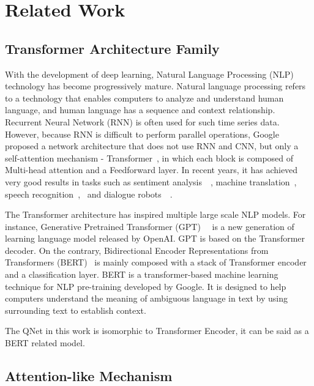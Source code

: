\section{Related Work}

\subsection{Transformer Architecture Family}

With the development of deep learning, Natural Language Processing (NLP) technology has become progressively mature.
Natural language processing refers to a technology that enables computers to analyze and understand human language, and human language has a sequence and context relationship. Recurrent Neural Network (RNN) is often used for such time series data. However, because RNN is difficult to perform parallel operations, Google proposed a network architecture that does not use RNN and CNN, but only a self-attention mechanism - Transformer~\cite{NIPS2017_3f5ee243}, in which each block is composed of Multi-head attention and a Feedforward layer. In recent years, it has achieved very good results in tasks such as sentiment analysis~\cite{naseem2020transformer}~\cite{wang2020transmodality}, machine translation~\cite{vaswani2018tensor2tensor}, speech recognition~\cite{dong2018speech},~\cite{gulati2020conformer} and dialogue robots~\cite{zandie2020emptransfo}~\cite{suglia2021embodied}.

The Transformer architecture has inspired multiple large scale NLP models. For instance, Generative Pretrained Transformer (GPT)~\cite{radford2019language}~\cite{NEURIPS2020_1457c0d6} is a new generation of learning language model released by OpenAI. GPT is based on the Transformer decoder. On the contrary, Bidirectional Encoder Representations from Transformers (BERT)~\cite{devlin2018bert} is mainly composed with a stack of Transformer encoder and a classification layer. BERT is a transformer-based machine learning technique for NLP pre-training developed by Google. It is designed to help computers understand the meaning of ambiguous language in text by using surrounding text to establish context.

The QNet in this work is isomorphic to Transformer Encoder, it can be said as a BERT related model.

\subsection{Attention-like Mechanism}

